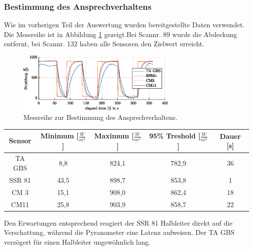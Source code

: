 \subsubsection{Bestimmung des Ansprechverhaltens}
Wie im vorherigen Teil der Auswertung wurden bereitgestellte Daten verwendet. Die Messreihe ist in Abbildung \ref{fig:response} gezeigt.Bei Scannr. 89 wurde die Abdeckung entfernt, bei Scannr. 132 haben alle Sensoren den Zielwert erreicht.
\begin{figure}[H]
	\centering
	\includegraphics[width=0.7\textwidth]{../DATA/Messreihe_Ansprechzeit.eps}
	\caption[Messreihe zur Bestimmung des Ansprechverhaltens.]{Messreihe zur Bestimmung des Ansprechverhaltens.}
	\label{fig:response}
\end{figure}

\begin{center}
	\begin{tabular}{c|c|c|c|c}
		\label{tab:response}
		
		\textbf{Sensor} & \textbf{Minimum} [$\frac{W}{m^2}$] & \textbf{Maximum} [$\frac{W}{m^2}$]& \textbf{95\% Treshold} [$\frac{W}{m^2}$] & \textbf{Dauer} [s]\\
		\hline
		TA GBS & 8,8 & 824,1 & 782,9 & 36 \\
		SSR 81 & 43,5 & 898,7 & 853,8 & 1 \\
		CM 3 & 15,1 & 908,0 & 862,4 & 18 \\
		CM11 & 25,8 & 903,9 & 858,7 & 22 \\
	\end{tabular}
\end{center}
Den Erwartungen entsprechend reagiert der SSR 81 Halbleiter direkt auf die Verschattung, während die Pyranometer eine Latenz aufweisen. Der TA GBS verzögert für einen Halbleiter ungewöhnlich lang.

